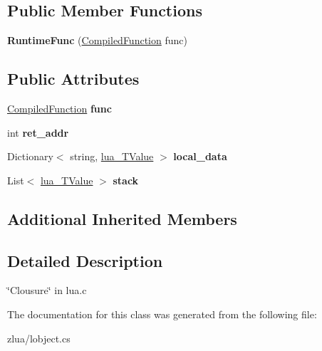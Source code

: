 \subsection*{Public Member Functions}
\begin{DoxyCompactItemize}
\item 
\mbox{\label{classzlua_1_1_lua_1_1_runtime_func_acf6437702233d215443f12cc033a536b}} 
{\bfseries Runtime\+Func} (\mbox{\hyperlink{classzlua_1_1_lua_1_1_compiled_function}{Compiled\+Function}} func)
\end{DoxyCompactItemize}
\subsection*{Public Attributes}
\begin{DoxyCompactItemize}
\item 
\mbox{\label{classzlua_1_1_lua_1_1_runtime_func_ac2fbe826eeac6e4875b47d3af3117571}} 
\mbox{\hyperlink{classzlua_1_1_lua_1_1_compiled_function}{Compiled\+Function}} {\bfseries func}
\item 
\mbox{\label{classzlua_1_1_lua_1_1_runtime_func_ad9d7c26bd702028d00cdbc04d6e50f36}} 
int {\bfseries ret\+\_\+addr}
\item 
\mbox{\label{classzlua_1_1_lua_1_1_runtime_func_aa4f6599f88b5e8c6c0a855b692f55bfa}} 
Dictionary$<$ string, \mbox{\hyperlink{classzlua_1_1_lua_1_1lua___t_value}{lua\+\_\+\+T\+Value}} $>$ {\bfseries local\+\_\+data}
\item 
\mbox{\label{classzlua_1_1_lua_1_1_runtime_func_a32dc9c10bc1dd79bd0d105e2da62035a}} 
List$<$ \mbox{\hyperlink{classzlua_1_1_lua_1_1lua___t_value}{lua\+\_\+\+T\+Value}} $>$ {\bfseries stack}
\end{DoxyCompactItemize}
\subsection*{Additional Inherited Members}


\subsection{Detailed Description}
\char`\"{}\+Clousure\char`\"{} in lua.\+c 



The documentation for this class was generated from the following file\+:\begin{DoxyCompactItemize}
\item 
zlua/lobject.\+cs\end{DoxyCompactItemize}
